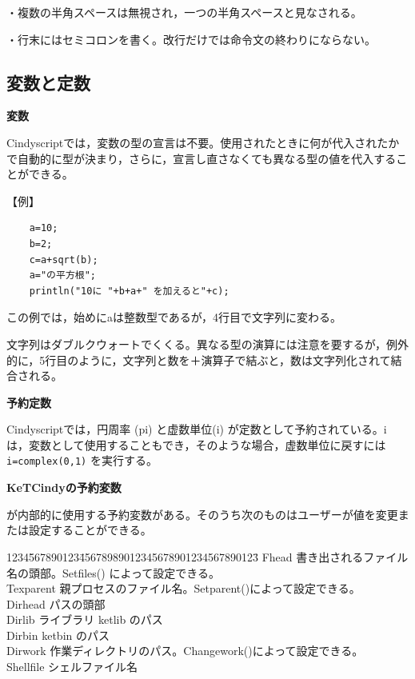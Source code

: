 \documentclass[papersize,a4paper,12pt,uplatex]{jsarticle}
\begin{document}
・複数の半角スペースは無視され，一つの半角スペースと見なされる。

・行末にはセミコロンを書く。改行だけでは命令文の終わりにならない。

\subsection{変数と定数}
\vspace{\baselineskip}\noindent
{\bf  変数}

Cindyscriptでは，変数の型の宣言は不要。使用されたときに何が代入されたかで自動的に型が決まり，さらに，宣言し直さなくても異なる型の値を代入することができる。

\vspace{\baselineskip}

【例】
\begin{verbatim}
    a=10;
    b=2;
    c=a+sqrt(b);
    a="の平方根";
    println("10に "+b+a+" を加えると"+c);
\end{verbatim}

この例では，始めにaは整数型であるが，4行目で文字列に変わる。

文字列はダブルクウォートでくくる。異なる型の演算には注意を要するが，例外的に，5行目のように，文字列と数を＋演算子で結ぶと，数は文字列化されて結合される。

\vspace{\baselineskip}\noindent
{\bf  予約定数}

Cindyscriptでは，円周率 (pi) と虚数単位(i) が定数として予約されている。i は，変数として使用することもでき，そのような場合，虚数単位に戻すには  \verb|i=complex(0,1)| を実行する。

\vspace{\baselineskip}\noindent
{\bf KeTCindyの予約変数}

 \ketcindy  が内部的に使用する予約変数がある。そのうち次のものはユーザーが値を変更または設定することができる。
\begin{tabbing}
1234\=567890123\=45678989012345678901234567890123\=\kill
  \>Fhead  \>書き出されるファイル名の頭部。Setfiles() によって設定できる。\\
  \>Texparent  \>親プロセスのファイル名。Setparent()によって設定できる。\\
  \>Dirhead  \>パスの頭部\\
  \>Dirlib  \>ライブラリ ketlib のパス\\
  \>Dirbin  \>ketbin のパス\\
  \>Dirwork  \>作業ディレクトリのパス。Changework()によって設定できる。\\
  \>Shellfile  \>シェルファイル名
\end{tabbing}
\end{document}
